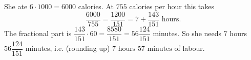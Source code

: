 She ate $6\cdot1000=6000$ calories. At $755$ calories per hour this takes
\[\dfrac{6000}{755}=\dfrac{1200}{151}=7+\dfrac{143}{151}\text{ hours}.\]
The fractional part is $\dfrac{143}{151}\cdot60=\dfrac{8580}{151}=56\dfrac{124}{151}$ minutes. So she needs $7$ hours $56\dfrac{124}{151}$ minutes, i.e. (rounding up) $\boxed{7\text{ hours }57\text{ minutes}}$ of labour.
